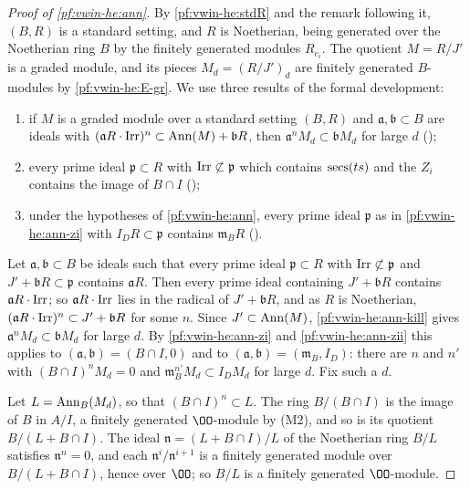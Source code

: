 \begin{proof}[Proof of \cref{pf:vwin-he:ann}]
By \cref{pf:vwin-he:stdR} and the remark following it, $(B,R)$ is a standard setting, and $R$ is Noetherian, being
generated over the Noetherian ring $B$ by the finitely generated modules $R_{e_i}$. The quotient $M=R/J'$ is a graded
module, and its pieces $M_d=(R/J')_d$ are finitely generated $B$-modules by \ref{pf:vwin-he:E-gr}. We use three
results of the formal development:
\begin{enumerate}[label=(\roman*)]
\item\label{pf:vwin-he:ann-kill} if $M$ is a graded module over a standard setting $(B,R)$ and
$\mathfrak a,\mathfrak b\subset B$ are ideals with $(\mathfrak aR\cdot\operatorname{Irr})^n\subset\operatorname{Ann}(M)+\mathfrak bR$,
then $\mathfrak a^nM_d\subset\mathfrak bM_d$ for large $d$ ();
\item\label{pf:vwin-he:ann-zi} every prime ideal $\mathfrak p\subset R$ with $\operatorname{Irr}\not\subset\mathfrak p$ which
contains $\operatorname{secs}(ts)$ and the $Z_i$ contains the image of $B\cap I$ ();
\item\label{pf:vwin-he:ann-zii} under the hypotheses of \cref{pf:vwin-he:ann}, every prime ideal $\mathfrak p$ as in
\ref{pf:vwin-he:ann-zi} with $I_DR\subset\mathfrak p$ contains $\mathfrak m_BR$
().
\end{enumerate}
Let $\mathfrak a,\mathfrak b\subset B$ be ideals such that every prime ideal $\mathfrak p\subset R$ with
$\operatorname{Irr}\not\subset\mathfrak p$ and $J'+\mathfrak bR\subset\mathfrak p$ contains $\mathfrak aR$. Then every prime
ideal containing $J'+\mathfrak bR$ contains $\mathfrak aR\cdot\operatorname{Irr}$; so $\mathfrak aR\cdot\operatorname{Irr}$ lies in the
radical of $J'+\mathfrak bR$, and as $R$ is Noetherian, $(\mathfrak aR\cdot\operatorname{Irr})^n\subset J'+\mathfrak bR$ for
some $n$. Since $J'\subset\operatorname{Ann}(M)$, \ref{pf:vwin-he:ann-kill} gives $\mathfrak a^nM_d\subset\mathfrak bM_d$ for
large $d$. By \ref{pf:vwin-he:ann-zi} and \ref{pf:vwin-he:ann-zii} this applies to $(\mathfrak a,\mathfrak b)=(B\cap
I,0)$ and to $(\mathfrak a,\mathfrak b)=(\mathfrak m_B,I_D)$: there are $n$ and $n'$ with $(B\cap I)^nM_d=0$ and
$\mathfrak m_B^{n'}M_d\subset I_DM_d$ for large $d$. Fix such a $d$.

Let $L=\operatorname{Ann}_B(M_d)$, so that $(B\cap I)^n\subset L$. The ring $B/(B\cap I)$ is the image of $B$ in $A/I$, a
finitely generated $\OO$-module by (M2), and so is its quotient $B/(L+B\cap I)$. The ideal
$\mathfrak n=(L+B\cap I)/L$ of the Noetherian ring $B/L$ satisfies $\mathfrak n^n=0$, and each
$\mathfrak n^i/\mathfrak n^{i+1}$ is a finitely generated module over $B/(L+B\cap I)$, hence over $\OO$; so $B/L$ is a
finitely generated $\OO$-module.


\end{proof}
